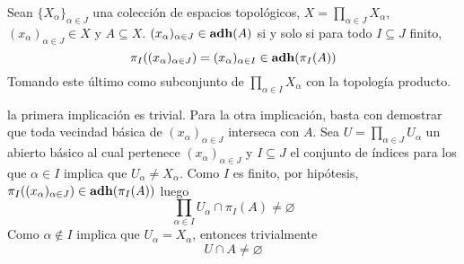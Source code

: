 \begin{Lema}
  Sean $\{X_\alpha\}_{\alpha\in J}$ una colección de espacios topológicos, $X=\prod_{\alpha\in J}X_\alpha$,
  $(x_\alpha)_{\alpha\in J}\in X$ y $A\subseteq X$. $(x_\alpha)_{\alpha\in J}\in\operatorname{\mathrm{\mathbf{adh}}}(A)$ si y solo si
  para todo $I\subseteq J$ finito, 
  \[\pi_I((x_\alpha)_{\alpha\in J})=(x_\alpha)_{\alpha\in I}\in \operatorname{\mathrm{\mathbf{adh}}}(\pi_I(A))\]
  Tomando este último como subconjunto de $\prod_{\alpha\in I}X_\alpha$ con la topología producto.
\end{Lema}
\begin{Demo}
  la primera implicación es trivial.
  Para la otra implicación, basta con demostrar que toda vecindad básica de $(x_\alpha)_{\alpha\in J}$
  interseca con $A$. Sea $U=\prod_{\alpha\in J}U_\alpha$ un abierto básico al cual pertenece
  $(x_\alpha)_{\alpha\in J}$ y $I\subseteq J$ el conjunto de índices para los que
  $\alpha\in I$ implica que $U_\alpha\neq X_\alpha$. Como $I$ es finito, por hipótesis,
  $\pi_I((x_\alpha)_{\alpha\in J})\in\operatorname{\mathrm{\mathbf{adh}}}(\pi_I(A))$ luego
  \[\prod_{\alpha\in I} U_\alpha\cap \pi_I(A)\neq\varnothing\]
  Como $\alpha\not\in I$ implica que $U_\alpha=X_\alpha$, entonces trivialmente
  \[U\cap A\neq \varnothing\]
\end{Demo}

